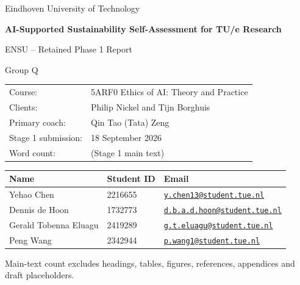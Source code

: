 \documentclass[11pt,a4paper]{article}
\begin{document}
\hypersetup{pageanchor=false}
\begin{titlepage}
\centering
\vspace*{3cm}
{\Large Eindhoven University of Technology\par}
\vspace{1.5cm}
{\huge\bfseries AI-Supported Sustainability Self-Assessment for TU/e Research\par}
\vspace{0.6cm}
{\Large ENSU -- Retained Phase 1 Report\par}
{\Large Group Q\par}
\vfill
\begin{tabularx}{0.95\textwidth}{@{}lX@{}}
Course: & 5ARF0 Ethics of AI: Theory and Practice \\
Clients: & Philip Nickel and Tijn Borghuis \\
Primary coach: & Qin Tao (Tata) Zeng \\
Stage 1 submission: & 18 September 2026 \\
Word count: & \mainwordcount{} (Stage 1 main text)
\end{tabularx}

\vspace{1cm}
\begin{tabularx}{0.95\textwidth}{@{}p{}p{}X@{}}
\toprule
Name & Student ID & Email \\
\midrule
Yehao Chen & 2216655 & \href{mailto:y.chen13@student.tue.nl}{\nolinkurl{y.chen13@student.tue.nl}} \\
Dennis de Hoon & 1732773 & \href{mailto:d.b.a.d.hoon@student.tue.nl}{\nolinkurl{d.b.a.d.hoon@student.tue.nl}} \\
Gerald Tobenna Eluagu & 2419289 & \href{mailto:g.t.eluagu@student.tue.nl}{\nolinkurl{g.t.eluagu@student.tue.nl}} \\
Peng Wang & 2342944 & \href{mailto:p.wang1@student.tue.nl}{\nolinkurl{p.wang1@student.tue.nl}} \\
\bottomrule
\end{tabularx}

\vspace{0.6cm}
{\footnotesize Main-text count excludes headings, tables, figures, references, appendices and draft placeholders.\par}

\vfill
\end{titlepage}
\hypersetup{pageanchor=true}



\clearpage
\nocite{*}


\appendix
\clearpage

\clearpage

\clearpage

\end{document}
